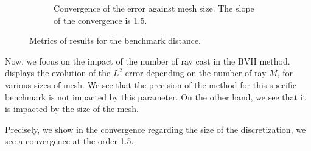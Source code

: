 \begin{figure}
\begin{subfigure}{0.49\textwidth}
    \caption{Convergence of the error against mesh size. The slope of the convergence is 1.5.}
    \label{fig:app:feelpp-distance:results:h}
  \end{subfigure}
  \caption{Metrics of results for the benchmark distance.}
  \label{fig:app:feelpp-distance:results}
\end{figure}

Now, we focus on the impact of the number of ray cast in the BVH method.
 displays the evolution of the $L^2$ error depending on the number of ray $M$, for various sizes of mesh.
We see that the precision of the method for this specific benchmark is not impacted by this parameter.
On the other hand, we see that it is impacted by the size of the mesh.

Precisely, we show in  the convergence regarding the size of the discretization, we see a convergence at the order 1.5.